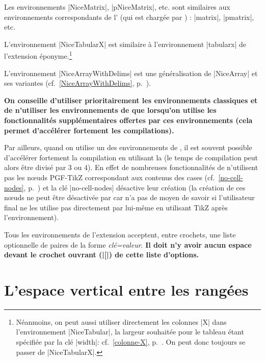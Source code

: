 \documentclass[dvipsnames]{article}
\begin{document}
\medskip
Les environnements |{NiceMatrix}|, |{pNiceMatrix}|, etc. sont similaires aux
environnements correspondants de l' (qui est chargée par
) : |{matrix}|, |{pmatrix}|, etc.

\medskip
L'environnement |{NiceTabularX}| est similaire à l'environnement
|{tabularx}| de l'extension éponyme.\footnote{Néanmoins, on peut aussi utiliser
  directement les colonnes |X| dans l'environnement |{NiceTabular}|, la largeur
  souhaitée pour le tableau étant spécifiée par la clé |width|:
  cf.~\ref{colonne-X}, p.~\pageref{colonne-X}. On peut donc toujours se passer
  de |{NiceTabularX}|.}

\medskip
L'environnement |{NiceArrayWithDelims}| est une généralisation de |{NiceArray}| et
ses variantes (cf.~\ref{NiceArrayWithDelims}, p.~\pageref{NiceArrayWithDelims}).

\medskip
\textbf{On conseille d'utiliser prioritairement les environnements classiques et de
n'utiliser les environnements de  que lorsqu'on utilise les
fonctionnalités supplémentaires offertes par ces environnements (cela permet
d'accélérer fortement les compilations).}


\medskip
Par ailleurs, quand on utilise un des environnements de , il est
souvent possible d'accélérer fortement la compilation en utilisant la
 (le temps de compilation peut alors être divisé par 3
ou 4). En effet de nombreuses fonctionnalités de  n'utilisent
pas les nœuds PGF-TikZ correspondant aux contenus des cases
(cf.~\ref{no-cell-nodes}, p.~\pageref{no-cell-nodes}) et la clé |no-cell-nodes|
désactive leur création (la création de ces nœuds ne peut être désactivée par
 car  n'a pas de moyen de savoir si
l'utilisateur final ne les utilise pas directement par lui-même en utilisant
TikZ après l'environnement).


\medskip
Tous les environnements de l'extension  acceptent, entre
crochets, une liste optionnelle de paires de la forme \textsl{clé=valeur}.
\textbf{Il doit n'y avoir aucun espace devant le crochet ouvrant (|[|) de
  cette liste d'options.}



\section{L'espace vertical entre les rangées}

\label{cell-space-limits}
\end{document}

